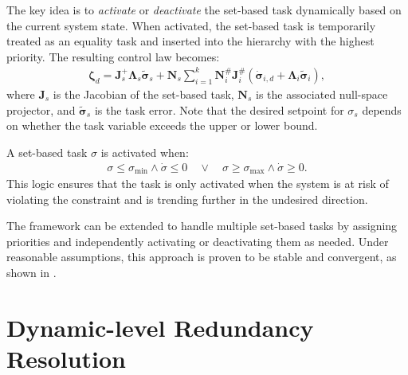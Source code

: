 The key idea is to \emph{activate} or \emph{deactivate} the set-based task dynamically based on the current system state. When activated, the set-based task is temporarily treated as an equality task and inserted into the hierarchy with the highest priority. The resulting control law becomes:
\begin{align}
    \bm{\zeta}_d = \bm{J}_s^{+}\bm{\Lambda}_s \tilde{\bm{\sigma}}_s + \bm{N}_s \sum_{i=1}^k \bm{N}_i^{\#}\bm{J}_i^{\#} \left(\dot{\bm{\sigma}}_{i,d} + \bm{\Lambda}_i \tilde{\bm{\sigma}}_i\right),
\end{align}
where \(\bm{J}_s\) is the Jacobian of the set-based task, \(\bm{N}_s\) is the associated null-space projector, and \(\tilde{\bm{\sigma}}_s\) is the task error. Note that the desired setpoint for \(\sigma_s\) depends on whether the task variable exceeds the upper or lower bound.

A set-based task \(\sigma\) is activated when:
\begin{align}
    \sigma \leq \sigma_{\text{min}} \land \dot{\sigma} \leq 0 \quad \lor \quad \sigma \geq \sigma_{\text{max}} \land \dot{\sigma} \geq 0.
\end{align}
This logic ensures that the task is only activated when the system is at risk of violating the constraint and is trending further in the undesired direction.

The framework can be extended to handle multiple set-based tasks by assigning priorities and independently activating or deactivating them as needed. Under reasonable assumptions, this approach is proven to be stable and convergent, as shown in \cite{moe}.



\section{Dynamic-level Redundancy Resolution}
\label{sec:tpc:dynamic_level}

